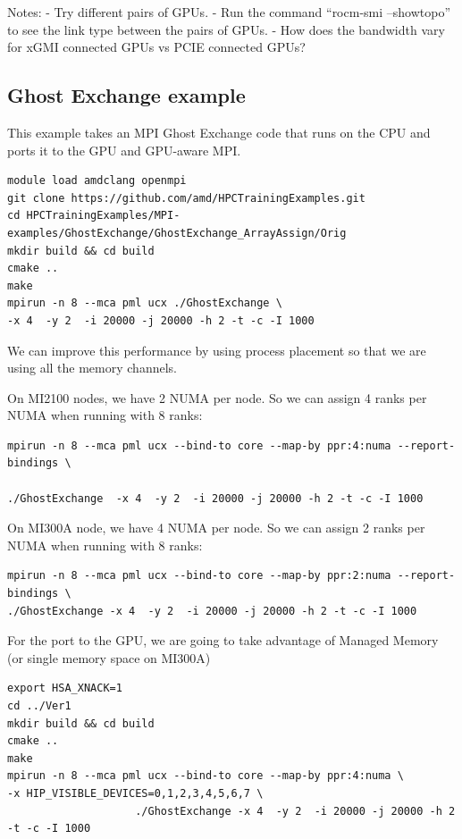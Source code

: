 \documentclass[
]{article}
\begin{document}
Notes: - Try different pairs of GPUs. - Run the command ``rocm-smi
--showtopo'' to see the link type between the pairs of GPUs. - How does
the bandwidth vary for xGMI connected GPUs vs PCIE connected GPUs?

\hypertarget{ghost-exchange-example}{%
\subsection{Ghost Exchange example}\label{ghost-exchange-example}}

This example takes an MPI Ghost Exchange code that runs on the CPU and
ports it to the GPU and GPU-aware MPI.

\begin{verbatim}
module load amdclang openmpi
git clone https://github.com/amd/HPCTrainingExamples.git
cd HPCTrainingExamples/MPI-examples/GhostExchange/GhostExchange_ArrayAssign/Orig
mkdir build && cd build
cmake ..
make
mpirun -n 8 --mca pml ucx ./GhostExchange \
-x 4  -y 2  -i 20000 -j 20000 -h 2 -t -c -I 1000
\end{verbatim}

We can improve this performance by using process placement so that we
are using all the memory channels.

On MI2100 nodes, we have 2 NUMA per node. So we can assign 4 ranks per
NUMA when running with 8 ranks:

\begin{verbatim}
mpirun -n 8 --mca pml ucx --bind-to core --map-by ppr:4:numa --report-bindings \

./GhostExchange  -x 4  -y 2  -i 20000 -j 20000 -h 2 -t -c -I 1000
\end{verbatim}

On MI300A node, we have 4 NUMA per node. So we can assign 2 ranks per
NUMA when running with 8 ranks:

\begin{verbatim}
mpirun -n 8 --mca pml ucx --bind-to core --map-by ppr:2:numa --report-bindings \
./GhostExchange -x 4  -y 2  -i 20000 -j 20000 -h 2 -t -c -I 1000
\end{verbatim}

For the port to the GPU, we are going to take advantage of Managed
Memory (or single memory space on MI300A)

\begin{verbatim}
export HSA_XNACK=1
cd ../Ver1
mkdir build && cd build
cmake ..
make
mpirun -n 8 --mca pml ucx --bind-to core --map-by ppr:4:numa \
-x HIP_VISIBLE_DEVICES=0,1,2,3,4,5,6,7 \ 
                    ./GhostExchange -x 4  -y 2  -i 20000 -j 20000 -h 2 -t -c -I 1000
\end{verbatim}
\end{document}
